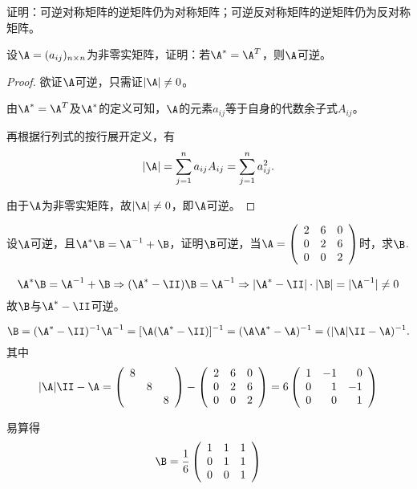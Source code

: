 \begin{li}
  证明：可逆对称矩阵的逆矩阵仍为对称矩阵；可逆反对称矩阵的逆矩阵仍为反对称矩阵。
\end{li}

\begin{li}
  设$\A=(a_{ij})_{n\times n}$为非零实矩阵，证明：若$\A^*=\A^T$，则$\A$可逆。
\end{li}
\begin{proof}
欲证$\A$可逆，只需证$|\A|\ne 0$。

由$\A^* = \A^T$及$\A^*$的定义可知，$\A$的元素$a_{ij}$等于自身的代数余子式$A_{ij}$。

再根据行列式的按行展开定义，有
$$
|\A| = \sum_{j=1}^n a_{ij} A_{ij} = \sum_{j=1}^n a_{ij}^2.
$$

由于$\A$为非零实矩阵，故$|\A|\ne 0$，即$\A$可逆。
\end{proof}

\begin{li}
  设$\A$可逆，且$\A^*\B = \A^{-1}+\B$，证明$\B$可逆，当$\A=\left(
    \begin{array}{ccc}
      2 & 6 & 0 \\
      0 & 2 & 6\\
      0 & 0 & 2
    \end{array}
  \right)$时，求$\B$.
\end{li}
\begin{jie}
$$
\A^*\B = \A^{-1}+\B  \Rightarrow (\A^*-\II)\B = \A^{-1}
\Rightarrow |\A^*-\II|\cdot |\B| = |\A^{-1}|\ne 0 
$$
故$\B$与$\A^*-\II$可逆。

$$
\B = (\A^*-\II)^{-1} \A^{-1} = [\A(\A^*-\II)]^{-1} = (\A\A^*-\A)^{-1} = (|\A|\II-\A)^{-1}.
$$
其中
$$
|\A|\II-\A = \left(
  \begin{array}{ccc}
    8 & &\\
      & 8 &\\
      & & 8
  \end{array}
\right) - \left(
  \begin{array}{ccc}
    2 & 6 & 0 \\
    0 & 2 & 6\\
    0 & 0 & 2
  \end{array}
\right) = 6 \left(
  \begin{array}{rrr}
    1 & -1 & 0 \\
    0 &  1 & -1\\
    0 & 0 & 1
  \end{array}
\right)
$$

易算得
$$
\B = \frac16 \left(
  \begin{array}{rrr}
    1 &  1 & 1 \\
    0 &  1 & 1\\
    0 & 0 & 1
  \end{array}
\right)
$$
\end{jie}

